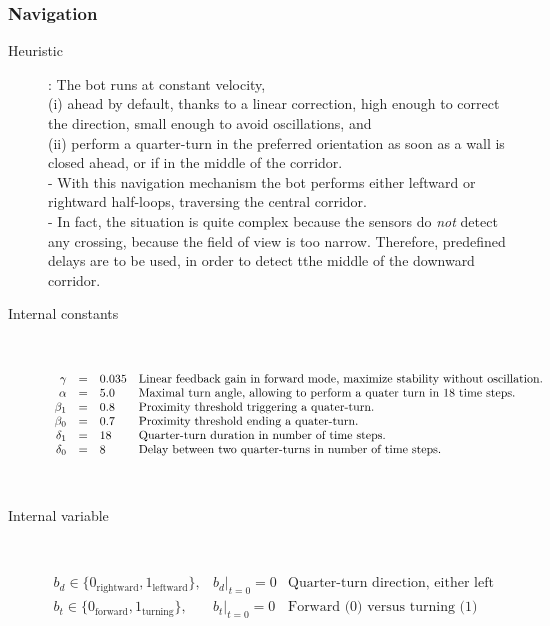 \documentclass[a4]{article} \usepackage[left=2cm,right=3cm,top=1cm,bottom=2cm]{geometry}
\newcommand{\eqline}[1]{~\vspace{0.1cm}\\\centerline{$#1$}\vspace{0.1cm}\\}
\newcommand{\tab}{\hphantom{4mm}}
\begin{document}
\subsubsection{Navigation}\begin{description}
\item[Heuristic]: The bot runs at constant velocity,
\\\tab (i) ahead by default, thanks to a linear correction, high enough to correct the direction, small enough to avoid oscillations, and
\\\tab (ii) perform a quarter-turn in the preferred orientation as soon as a wall is closed ahead, or if in the middle of the corridor.
\\- With this navigation mechanism the bot performs either leftward or rightward half-loops, traversing the central corridor.
\\- In fact, the situation is quite complex because the sensors do {\em not} detect any crossing, because the field of view is too narrow. Therefore, predefined delays are to be used, in order to detect tthe middle of the downward corridor.
\item[Internal constants]  \eqline{\begin{array}{rcll}
    \gamma &=& 0.035 & \mbox{\parbox{12cm}{Linear feedback gain in forward mode, maximize stability without oscillation.}} \\
    \alpha    &=& 5.0 & \mbox{\parbox{12cm}{Maximal turn angle, allowing to perform a quater turn in $18$ time steps.}} \\
    \beta_1   &=& 0.8 & \mbox{\parbox{12cm}{Proximity threshold triggering a quater-turn.}} \\
    \beta_0   &=& 0.7 & \mbox{\parbox{12cm}{Proximity threshold ending a quater-turn.}} \\
    \delta _1   &=& 18 & \mbox{\parbox{12cm}{Quarter-turn duration in number of time steps.}} \\
    \delta _0   &=& 8 & \mbox{\parbox{12cm}{Delay between two quarter-turns in number of time steps.}} \\
\end{array}}
\item[Internal variable]  \eqline{\begin{array}{rcll}
  b_d \in \{0_{\mbox{rightward}}, 1_{\mbox{leftward}}\}, &\left.b_d\right|_{t = 0} = 0 & \mbox{Quarter-turn direction, either left (1) or right (0).} \\
  b_t \in \{0_{\mbox{forward}}, 1_{\mbox{turning}}\}, &\left.b_t\right|_{t = 0} = 0 & \mbox{Forward (0) versus turning (1) mode.} \\

\end{array}}
\end{description}
\end{document}
